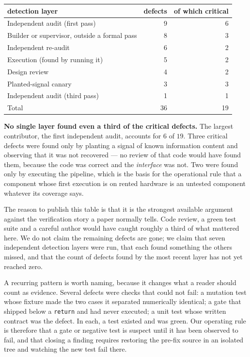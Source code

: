 \begin{center}
\begin{tabular}{lrr}
\toprule
detection layer & defects & of which critical \\
\midrule
Independent audit (first pass) & 9 & 6 \\
Builder or supervisor, outside a formal pass & 8 & 3 \\
Independent re-audit & 6 & 2 \\
Execution (found by running it) & 5 & 2 \\
Design review & 4 & 2 \\
Planted-signal canary & 3 & 3 \\
Independent audit (third pass) & 1 & 1 \\
\midrule
Total & 36 & 19 \\
\bottomrule
\end{tabular}
\end{center}

\textbf{No single layer found even a third of the critical defects.} The largest contributor, the
first independent audit, accounts for $6$ of $19$. Three critical defects were found only by
planting a signal of known information content and observing that it was not recovered --- no
review of that code would have found them, because the code was correct and the \emph{interface}
was not. Two were found only by executing the pipeline, which is the basis for the operational rule
that a component whose first execution is on rented hardware is an untested component whatever its
coverage says.

The reason to publish this table is that it is the strongest available argument against the
verification story a paper normally tells. Code review, a green test suite and a careful author
would have caught roughly a third of what mattered here. We do not claim the remaining defects are
gone; we claim that seven independent detection layers were run, that each found something the
others missed, and that the count of defects found by the most recent layer has not yet reached
zero.

A recurring pattern is worth naming, because it changes what a reader should count as evidence.
Several defects were checks that could not fail: a mutation test whose fixture made the two cases
it separated numerically identical; a gate that shipped below a \texttt{return} and had never
executed; a unit test whose written contract was the defect. In each, a test existed and was
green. Our operating rule is therefore that a gate or negative test is suspect until it has been
observed to fail, and that closing a finding requires restoring the pre-fix source in an isolated
tree and watching the new test fail there.

